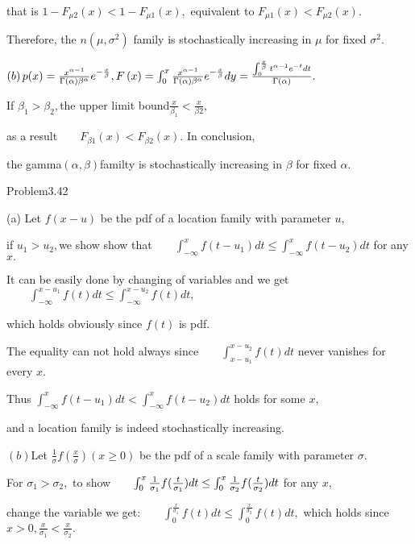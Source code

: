 \documentclass{article}
\begin{document}
that is $1-F_{\mu 2}\left( x\right) <1-F_{\mu 1}\left( x\right) ,$
equivalent to $F_{\mu 1}(x)<F_{\mu 2}\left( x\right) .$

Therefore, the $n\left( \mu ,\sigma ^{2}\right) $ family is stochastically
increasing in $\mu $ for fixed $\sigma ^{2}.$

$\left( b\right) p(x)=\frac{x^{\alpha -1}}{\Gamma \left( \alpha \right)
\beta ^{\alpha }}e^{-\frac{x}{\beta }},F\left( x\right) =\int_{0}^{x}\frac{%
x^{\alpha -1}}{\Gamma \left( \alpha \right) \beta ^{\alpha }}e^{-\frac{x}{%
\beta }}dy=\frac{\int_{0}^{\frac{x}{\beta }}t^{\alpha -1}e^{-t}dt}{\Gamma
\left( \alpha \right) }.$

If $\beta _{1}>\beta _{2},$the upper limit bound$\frac{x}{\beta _{1}}<\frac{x%
}{\beta 2},$

as a result$\qquad F_{\beta 1}\left( x\right) <F_{\beta 2}\left( x\right) .$%
In conclusion,

the gamma$\left( \alpha ,\beta \right) $familty is stochastically increasing
in $\beta $ for fixed $\alpha .$

Problem3.42

\bigskip (a) Let $f\left( x-u\right) $ be the pdf of a location family with
parameter $u,$

if $u_{1}>u_{2},$we show show that$\qquad \int_{-\infty
}^{x}f(t-u_{1})dt\leq \int_{-\infty }^{x}f(t-u_{2})dt$ for any $x.$

It can be easily done by changing of variables and we get$\qquad
\int_{-\infty }^{x-u_{1}}f(t)dt\leq \int_{-\infty }^{x-u_{2}}f(t)dt,$

which holds obviously since $f\left( t\right) $ is pdf.

The equality can not hold always since$\qquad \int_{x-u_{1}}^{x-u_{2}}f(t)dt$
never vanishes for every $x.$

Thus $\int_{-\infty }^{x}f(t-u_{1})dt<\int_{-\infty }^{x}f(t-u_{2})dt$ holds
for some $x,$

and a location family is indeed stochastically increasing.

$\left( b\right) $Let $\frac{1}{\sigma }f\left( \frac{x}{\sigma }\right)
\left( x\geq 0\right) $ be the pdf of a scale family with parameter $\sigma
. $

For $\sigma _{1}>\sigma _{2},$ to show$\qquad \int_{0}^{x}\frac{1}{\sigma
_{1}}f(\frac{t}{\sigma _{1}})dt\leq \int_{0}^{x}\frac{1}{\sigma _{2}}f(\frac{%
t}{\sigma _{2}})dt$ for any $x,$

change the variable we get:$\qquad \int_{0}^{\frac{x}{\sigma _{1}}%
}f(t)dt\leq \int_{0}^{\frac{x}{\sigma _{2}}}f(t)dt,$ which holds since $x>0,%
\frac{x}{\sigma _{1}}<\frac{x}{\sigma _{2}}.$
\end{document}
